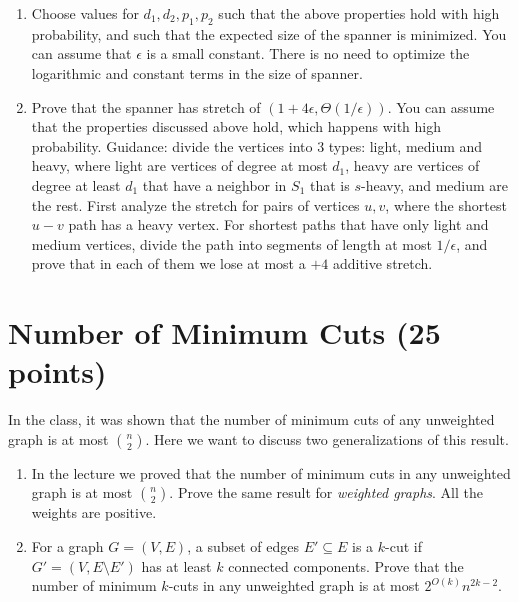 \documentclass[11pt]{article}
\begin{document}
\begin{enumerate}
    \item Choose values for $d_1,d_2,p_1,p_2$ such that the above properties hold with high probability, and such that the expected size of the spanner is minimized. You can assume that $\epsilon$ is a small constant. There is no need to optimize the logarithmic and constant terms in the size of spanner.
    \item Prove that the spanner has stretch of $(1+4\epsilon,\Theta(1/\epsilon))$. You can assume that the properties discussed above hold, which happens with high probability.
    Guidance: divide the vertices into 3 types: light, medium and heavy, where light are vertices of degree at most $d_1$, heavy are vertices of degree at least $d_1$ that have a neighbor in $S_1$ that is $s$-heavy, and medium are the rest. First analyze the stretch for pairs of vertices $u,v$, where the shortest $u-v$ path has a heavy vertex. For shortest paths that have only light and medium vertices, divide the path into segments of length at most $1/\epsilon$, and prove that in each of them we lose at most a $+4$ additive stretch.
\end{enumerate}

\section{Number of Minimum Cuts (25 points)}
In the class, it was shown that the number of minimum cuts of any unweighted graph is at most $\binom{n}{2}$. Here we want to discuss two generalizations of this result.

\begin{enumerate}
    \item In the lecture we proved that the number of minimum cuts in any unweighted graph is at most $\binom{n}{2}$. Prove the same result for \emph{weighted graphs}. All the weights are positive.
    
    \item For a graph $G = (V, E)$, a subset of edges $E' \subseteq E$ is a $k$-cut if $G' = (V, E \setminus E')$ has at least $k$ connected components. Prove that the number of minimum $k$-cuts in any unweighted graph is at most $2^{O(k)}n^{2k-2}$.
\end{enumerate}




%
%
\end{document}
